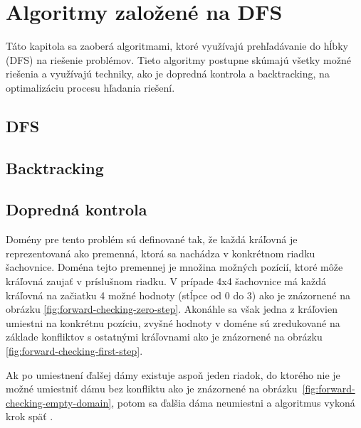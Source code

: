 
\chapter{Algoritmy založené na DFS}

Táto kapitola sa zaoberá algoritmami, ktoré využívajú prehľadávanie do hĺbky (DFS) na riešenie problémov. Tieto algoritmy postupne skúmajú všetky možné riešenia a využívajú techniky, ako je dopredná kontrola a backtracking, na optimalizáciu procesu hľadania riešení.

\section*{DFS}
\section*{Backtracking}
\section*{Dopredná kontrola}
Domény pre tento problém sú definované tak, že každá kráľovná je reprezentovaná ako premenná, ktorá sa nachádza v konkrétnom riadku šachovnice. Doména tejto premennej je množina možných pozícií, ktoré môže kráľovná zaujať v príslušnom riadku. V prípade 4x4 šachovnice má každá kráľovná na začiatku 4 možné hodnoty (stĺpce od 0 do 3) ako je znázornené na obrázku \ref{fig:forward-checking-zero-step}. Akonáhle sa však jedna z kráľovien umiestni na konkrétnu pozíciu, zvyšné hodnoty v doméne sú zredukované na základe konfliktov s ostatnými kráľovnami ako je znázornené na obrázku \ref{fig:forward-checking-first-step}.\par

Ak po umiestnení ďalšej dámy existuje aspoň jeden riadok, do ktorého nie je možné umiestniť dámu bez konfliktu ako je znázornené na obrázku~\ref{fig:forward-checking-empty-domain}, potom sa ďalšia dáma neumiestni a algoritmus vykoná krok späť .


